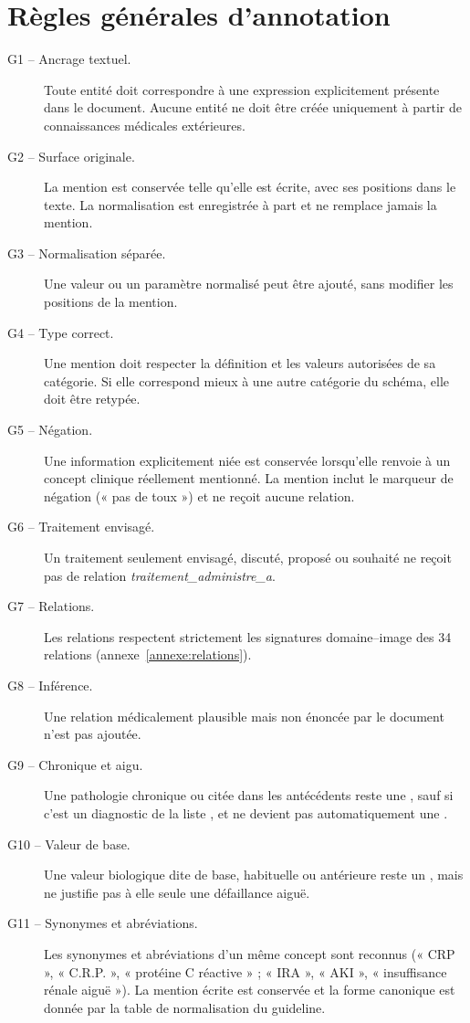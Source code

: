 \section{Règles générales d'annotation}\label{annexe:regles-generales}

\begin{description}
  \item[G1 -- Ancrage textuel.] Toute entité doit correspondre à une expression explicitement présente dans le document. Aucune entité ne doit être créée uniquement à partir de connaissances médicales extérieures.
  \item[G2 -- Surface originale.] La mention est conservée telle qu'elle est écrite, avec ses positions dans le texte. La normalisation est enregistrée à part et ne remplace jamais la mention.
  \item[G3 -- Normalisation séparée.] Une valeur ou un paramètre normalisé peut être ajouté, sans modifier les positions de la mention.
  \item[G4 -- Type correct.] Une mention doit respecter la définition et les valeurs autorisées de sa catégorie. Si elle correspond mieux à une autre catégorie du schéma, elle doit être retypée.
  \item[G5 -- Négation.] Une information explicitement niée est conservée lorsqu'elle renvoie à un concept clinique réellement mentionné. La mention inclut le marqueur de négation (« pas de toux ») et ne reçoit aucune relation.
  \item[G6 -- Traitement envisagé.] Un traitement seulement envisagé, discuté, proposé ou souhaité ne reçoit pas de relation \emph{traitement\_administre\_a}.
  \item[G7 -- Relations.] Les relations respectent strictement les signatures domaine--image des 34 relations (annexe~\ref{annexe:relations}).
  \item[G8 -- Inférence.] Une relation médicalement plausible mais non énoncée par le document n'est pas ajoutée.
  \item[G9 -- Chronique et aigu.] Une pathologie chronique ou citée dans les antécédents reste une , sauf si c'est un diagnostic de la liste , et ne devient pas automatiquement une .
  \item[G10 -- Valeur de base.] Une valeur biologique dite de base, habituelle ou antérieure reste un , mais ne justifie pas à elle seule une défaillance aiguë.
  \item[G11 -- Synonymes et abréviations.] Les synonymes et abréviations d'un même concept sont reconnus (« CRP », « C.R.P. », « protéine C réactive » ; « IRA », « AKI », « insuffisance rénale aiguë »). La mention écrite est conservée et la forme canonique est donnée par la table de normalisation du guideline.

\end{description}
